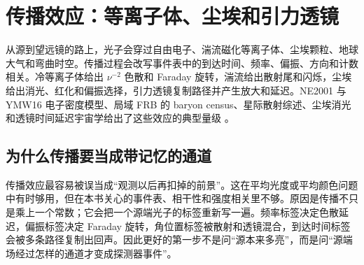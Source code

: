 \chapter{传播效应：等离子体、尘埃和引力透镜}
\label{chap:14}

\begin{chapteropening}
从源到望远镜的路上，光子会穿过自由电子、湍流磁化等离子体、尘埃颗粒、地球大气和弯曲时空。传播过程会改写事件表中的到达时间、频率、偏振、方向和计数相关。冷等离子体给出 \(\nu^{-2}\) 色散和 Faraday 旋转，湍流给出散射尾和闪烁，尘埃给出消光、红化和偏振选择，引力透镜复制路径并产生放大和延迟。NE2001 与 YMW16 电子密度模型、局域 FRB 的 baryon census、星际散射综述、尘埃消光和透镜时间延迟宇宙学给出了这些效应的典型量级 \citep{2002astro.ph..7156C,2017ApJ...835...29Y,2020Natur.581..391M,1977ARA&A..15..479R,1990ARA&A..28..561R,2004ApJ...605..759B,1989ApJ...345..245C,1999PASP..111...63F,1964MNRAS.128..295R,1964MNRAS.128..307R,2016A&ARv..24...11T}。
\end{chapteropening}

\section{为什么传播要当成带记忆的通道}

传播效应最容易被误当成“观测以后再扣掉的前景”。这在平均光度或平均颜色问题中有时够用，但在本书关心的事件表、相干性和强度相关里不够。原因是传播不只是乘上一个常数；它会把一个源端光子的标签重新写一遍。频率标签决定色散延迟，偏振标签决定 Faraday 旋转，角位置标签被散射和透镜混合，到达时间标签会被多条路径复制出回声。因此更好的第一步不是问“源本来多亮”，而是问“源端场经过怎样的通道才变成探测器事件”。

